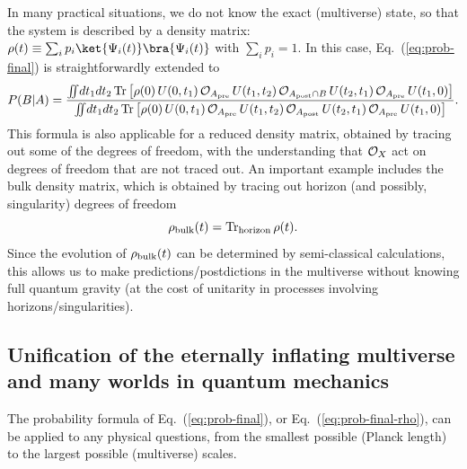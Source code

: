 \documentclass[12pt]{article}
\begin{document}
In many practical situations, we do not know the exact (multiverse) 
state, so that the system is described by a density matrix:\ $\rho(t) 
\equiv \sum_i p_i \ket{\Psi_i(t)} \bra{\Psi_i(t)}$ with $\sum_i p_i = 1$. 
In this case, Eq.~(\ref{eq:prob-final}) is straightforwardly extended to
%
\begin{equation}\small
  P(B|A) = \frac{\int\!\!\!\int\!dt_1 dt_2\, {\rm Tr}\left[ \rho(0)\, 
    U(0,t_1)\, {\cal O}_{A_{\rm pre}}\, U(t_1,t_2)\, 
    {\cal O}_{A_{\rm post} \cap B}\, U(t_2,t_1)\, {\cal O}_{A_{\rm pre}}\, 
    U(t_1,0) \right]}
  {\int\!\!\!\int\!dt_1 dt_2\, {\rm Tr}\left[ \rho(0)\, 
    U(0,t_1)\, {\cal O}_{A_{\rm pre}}\, U(t_1,t_2)\, 
    {\cal O}_{A_{\rm post}}\, U(t_2,t_1)\, {\cal O}_{A_{\rm pre}}\, 
    U(t_1,0) \right]}.
\label{eq:prob-final-rho}
\end{equation}
%
This formula is also applicable for a reduced density matrix, obtained 
by tracing out some of the degrees of freedom, with the understanding 
that ${\cal O}_X$ act on degrees of freedom that are not traced 
out.  An important example includes the bulk density matrix, which 
is obtained by tracing out horizon (and possibly, singularity) degrees 
of freedom~\cite{Nomura:2011dt}
%
\begin{equation}
  \rho_{\rm bulk}(t) = {\rm Tr}_{\rm horizon}\, \rho(t).
\label{eq:rho-red_bulk}
\end{equation}
%
Since the evolution of $\rho_{\rm bulk}(t)$ can be determined by 
semi-classical calculations, this allows us to make predictions/postdictions 
in the multiverse without knowing full quantum gravity (at the cost of 
unitarity in processes involving horizons/singularities).


\subsection{Unification of the eternally inflating multiverse and many 
 worlds in quantum mechanics}

The probability formula of Eq.~(\ref{eq:prob-final}), or 
Eq.~(\ref{eq:prob-final-rho}), can be applied to any physical 
questions, from the smallest possible (Planck length) to the largest 
possible (multiverse) scales.
\end{document}
